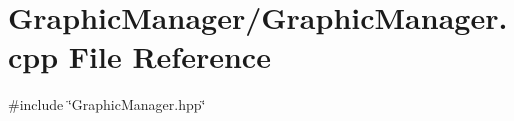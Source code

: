 \section{Graphic\+Manager/\+Graphic\+Manager.cpp File Reference}
\label{_graphic_manager_8cpp}
{\ttfamily \#include \char`\"{}Graphic\+Manager.\+hpp\char`\"{}}\newline
